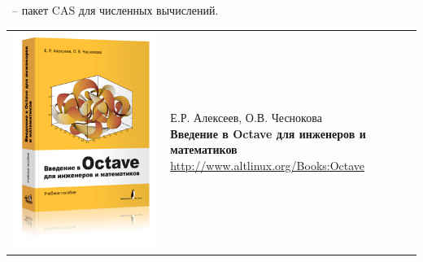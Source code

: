 \secdown

\ -- пакет CAS для численных вычислений.

\bigskip\noindent
\begin{tabular}{p{} p{}}
\includegraphics[height=0.45\textheight]{math/octave/BookOctave.png}
&
\parbox[b]{0.7\textwidth}{
Е.Р. Алексеев, О.В. Чеснокова\\
\textbf{Введение в Octave для инженеров и математиков}\\
\url{http://www.altlinux.org/Books:Octave}
}
\\
\end{tabular}

\secup
